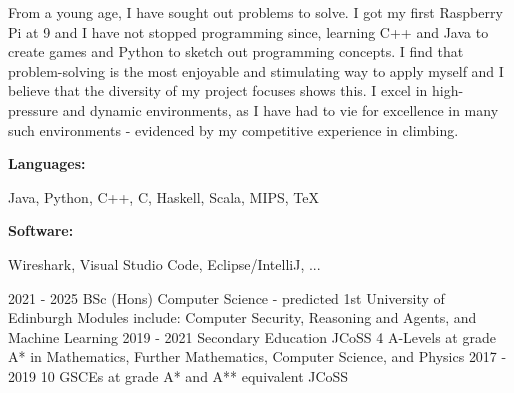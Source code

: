 \documentclass[9pt]{developercv} %
\begin{document}
\begin{minipage}[t]{0.66\textwidth}
    From a young age, I have sought out problems to solve. 
	I got my first Raspberry Pi at 9 and I have not stopped programming since, learning C++ and Java to create games and Python to sketch out programming concepts. 
	I find that problem-solving is the most enjoyable and stimulating way to apply myself and I believe that the diversity of my project focuses shows this. 
    I excel in high-pressure and dynamic environments, as I have had to vie for excellence in many such environments - evidenced by my competitive experience in climbing.
\end{minipage}
\hfill %
\begin{minipage}[t]{0.265\textwidth}
    \vspace{-6pt}
    
    \begin{minipage}[t]{0.23\textwidth}
        \textbf{Languages:}
    \end{minipage}
    \hfill
    \begin{minipage}[t]{0.60\textwidth}
      Java, Python, C++, C, Haskell, Scala, MIPS, TeX
    \end{minipage}
    \vspace{4mm}
    
    \begin{minipage}[t]{0.15\textwidth}
        \textbf{Software:}
    \end{minipage}
    \hfill
    \begin{minipage}[t]{0.68\textwidth}
      Wireshark, Visual Studio Code, Eclipse/IntelliJ, ...
    \end{minipage}
    
\end{minipage}


\vspace{-5 pt}
\begin{entrylist}
    \entry
		{2021 - 2025}
		{BSc (Hons) Computer Science - predicted 1st}
		{University of Edinburgh}
		{Modules include: Computer Security, Reasoning and Agents, and Machine Learning}
    \entry
		{2019 - 2021}
		{Secondary Education}
		{JCoSS}
		{4 A-Levels at grade A* in Mathematics, Further Mathematics, Computer Science, and Physics}
	\entry
		{2017 - 2019}
		{10 GSCEs at grade A* and A** equivalent}
		{JCoSS}
		{ }
\end{entrylist}
\end{document}

